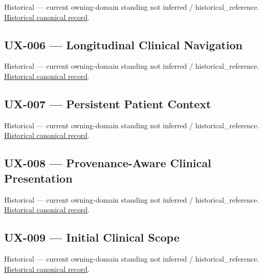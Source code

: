 \par\label{element:32c55c722ae147329784976793abd458}
Historical — current owning-domain standing not inferred / historical\_reference. \href{../../../../continuum/motivation/requirement/32c55c722ae147329784976793abd458.md}{Historical canonical record}.\par

\subsection{UX-006 — Longitudinal Clinical Navigation}

\par\label{element:09318a29f8b747c8ac6b0e276e2febb4}
Historical — current owning-domain standing not inferred / historical\_reference. \href{../../../../continuum/motivation/requirement/09318a29f8b747c8ac6b0e276e2febb4.md}{Historical canonical record}.\par

\subsection{UX-007 — Persistent Patient Context}

\par\label{element:873b8b2c9a514ab387833beb5552feda}
Historical — current owning-domain standing not inferred / historical\_reference. \href{../../../../continuum/motivation/requirement/873b8b2c9a514ab387833beb5552feda.md}{Historical canonical record}.\par

\subsection{UX-008 — Provenance-Aware Clinical Presentation}

\par\label{element:bb298bafe5894d9b9c057b896f669c06}
Historical — current owning-domain standing not inferred / historical\_reference. \href{../../../../continuum/motivation/requirement/bb298bafe5894d9b9c057b896f669c06.md}{Historical canonical record}.\par

\subsection{UX-009 — Initial Clinical Scope}

\par\label{element:807861850fa54d6c849e3e26d7172b9c}
Historical — current owning-domain standing not inferred / historical\_reference. \href{../../../../continuum/motivation/requirement/807861850fa54d6c849e3e26d7172b9c.md}{Historical canonical record}.\par

